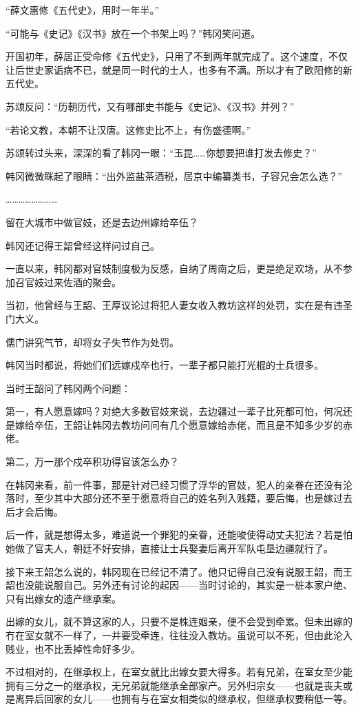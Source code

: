 “薛文惠修《五代史》，用时一年半。”

“可能与《史记》《汉书》放在一个书架上吗？”韩冈笑问道。

开国初年，薛居正受命修《五代史》，只用了不到两年就完成了。这个速度，不仅让后世史家诟病不已，就是同一时代的士人，也多有不满。所以才有了欧阳修的新五代史。

苏颂反问：“历朝历代，又有哪部史书能与《史记》、《汉书》并列？”

“若论文教，本朝不让汉唐。这修史比不上，有伤盛德啊。”

苏颂转过头来，深深的看了韩冈一眼：“玉昆……你想要把谁打发去修史？”

韩冈微微眯起了眼睛：“出外监盐茶酒税，居京中编纂类书，子容兄会怎么选？”

……………………

留在大城市中做官妓，还是去边州嫁给卒伍？

韩冈还记得王韶曾经这样问过自己。

一直以来，韩冈都对官妓制度极为反感，自纳了周南之后，更是绝足欢场，从不参加召官妓过来佐酒的聚会。

当初，他曾经与王韶、王厚议论过将犯人妻女收入教坊这样的处罚，实在是有违圣门大义。

儒门讲究气节，却将女子失节作为处罚。

韩冈当时都说，将她们们远嫁戍卒也行，一辈子都只能打光棍的士兵很多。

当时王韶问了韩冈两个问题：

第一，有人愿意嫁吗？对绝大多数官妓来说，去边疆过一辈子比死都可怕，何况还是嫁给卒伍，王韶让韩冈去教坊问问有几个愿意嫁给赤佬，而且是不知多少岁的赤佬。

第二，万一那个戍卒积功得官该怎么办？

在韩冈来看，前一件事，那是针对已经习惯了浮华的官妓，犯人的亲眷在还没有沦落时，至少其中大部分还不至于愿意将自己的姓名列入贱籍，要后悔，也是嫁过去后才会后悔。

后一件，就是想得太多，难道说一个罪犯的亲眷，还能唆使得动丈夫犯法？若是怕她做了官夫人，朝廷不好安排，直接让士兵娶妻后离开军队屯垦边疆就行了。

接下来王韶怎么说的，韩冈现在已经记不清了。他只记得自己没有说服王韶，而王韶也没能说服自己。另外还有讨论的起因——当时讨论的，其实是一桩本家户绝、只有出嫁女的遗产继承案。

出嫁的女儿，就不算这家的人，只要不是株连姻亲，便不会受到牵累。但未出嫁的冇在室女就不一样了，一并要受牵连，往往没入教坊。虽说可以不死，但由此沦入贱业，也不比丢掉性命好多少。

不过相对的，在继承权上，在室女就比出嫁女要大得多。若有兄弟，在室女至少能拥有三分之一的继承权，无兄弟就能继承全部家产。另外归宗女——也就是丧夫或是离异后回家的女儿——也拥有与在室女相类似的继承权，但继承权要稍低一等。

